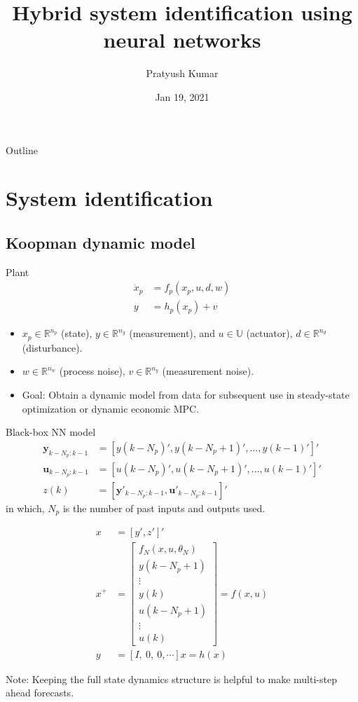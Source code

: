 \documentclass[xcolor=dvipsnames, 8pt]{beamer} %
\title{Hybrid system identification using neural networks}
\date{Jan 19, 2021}
\author[Pratyush Kumar]{\large Pratyush Kumar}
\institute[UCSB]{
	\begin{minipage}{4in}
		\vspace{-10pt}
		\centering
		\raisebox{-0.1\height}{\texttt{[image: UCSB\_seal]}}
	\end{minipage}
	\vspace{10pt}
	\newline
	{\large Department of chemical engineering}
	\vspace{10pt}
	\newline
	{\large Group talk}}
\newcommand{\bbR}{\mathbb{R}}
\newcommand{\bbU}{\mathbb{U}}
\begin{document}
	
\begin{frame}{Outline}
\tableofcontents
\end{frame}

\section{System identification}

\subsection{Koopman dynamic model}

\begin{frame}{Plant}
\begin{align*}
\dot x_p &= f_p(x_p, u, d, w) \\
y &= h_p(x_p) + v
\end{align*}

\begin{itemize}
	\setlength{\itemsep}{10pt}%
	\item $x_p \in \bbR^{n_p}$ (state), $y \in \bbR^{n_y}$ (measurement), 
	and $u \in \bbU$ (actuator), $d \in \bbR^{n_d}$ (disturbance). 
	\item $w \in \bbR^{n_w}$ (process noise), $v \in \bbR^{n_y}$ (measurement 
	noise).
	\item Goal: Obtain a dynamic model from data for subsequent use in 
	steady-state optimization or dynamic economic MPC.
\end{itemize}
\end{frame}

\begin{frame}{Black-box NN model}
\begin{align*}
\mathbf{y}_{k-N_p:k-1} &= [y(k-N_p)', y(k-N_p+1)', ..., y(k-1)']' \\
\mathbf{u}_{k-N_p:k-1} &= [u(k-N_p)', u(k-N_p+1)', ..., u(k-1)']' \\
z(k) &= [\mathbf{y}'_{k-N_p:k-1}, \mathbf{u}'_{k-N_p:k-1}]'
\end{align*}
in which, $N_p$ is the number of past inputs and outputs used.

\begin{align*}
x &= [y', z']' \\
x^+ &= \begin{bmatrix}
f_N(x, u, \theta_N) \\
y(k-N_p+1) \\
\vdots \\
y(k) \\
u(k-N_p+1) \\ 
\vdots \\
u(k)
\end{bmatrix} = f(x, u)\\
y &= [I, \ 0,\  0, \cdots]x = h(x)
\end{align*}

Note: Keeping the full state dynamics structure is helpful to make multi-step 
ahead forecasts.
\end{frame}
\end{document}
